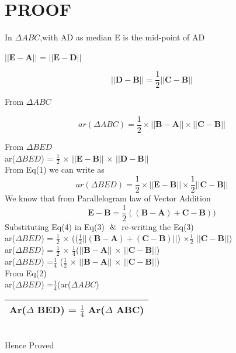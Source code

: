 \documentclass[journal,10pt,twocolumn]{article}
\let\vec\mathbf
\begin{document}
\section{PROOF}
In $\Delta ABC$,with AD as median
E is the mid-point of AD
\begin{center}
    $||{\vec{E-A}}||$ = $||{\vec{E-D}}||$
\end{center}
\begin{center}
\begin{equation}
    ||{\vec{D-B}}|| = \frac{1}{2} ||{\vec{C-B}}||
\end{equation}
\end{center}
\begin{flushleft}
From $\Delta ABC$
\end{flushleft}
\begin{equation}
    ar(\Delta ABC) = \frac{1}{2} \times ||{\vec{B-A}}|| \times ||{\vec{C-B}}||
\end{equation}
\begin{flushleft}
From $\Delta BED$
\vspace{0.3cm}\\
ar($\Delta BED$) = $\frac{1}{2}$ $\times$ $||{\vec{E-B}}||$ $\times$ $||{\vec{D-B}}||$
\vspace{0.3cm}\\
From Eq(1) we can write as
\begin{equation}
    ar(\Delta BED) = \frac{1}{2} \times ||{\vec{E-B}}|| \times\frac{1}{2} ||{\vec{C-B}}||
\end{equation}
We know that from Parallelogram law of Vector Addition
\begin{equation}
     \vec{E-B} = \frac{1}{2} ((\vec{B-A}) + \vec{C-B}))
\end{equation}
Substituting Eq(4) in Eq(3) $\And$ re-writing the Eq(3)\\
\vspace{0.3cm}
ar($\Delta BED$) = $\frac{1}{2}$ $\times$ (($\frac{1}{2}$$||{\vec{(B-A) + (C-B)}}||$) $\times$$\frac{1}{2}$ $||{\vec{C-B}}||$)
\vspace{0.5cm}\\
ar($\Delta BED$) = $\frac{1}{2}$ $\times$ $\frac{1}{4}$($||{\vec{B-A}}||$ $\times$ $||{\vec{C-B}}||$)
\vspace{0.5cm}\\
ar($\Delta BED$) =$\frac{1}{4}$ ($\frac{1}{2}$ $\times$ $||{\vec{B-A}}||$ $\times$ $||{\vec{C-B}}||$)
\vspace{0.5cm}\\
From Eq(2)
\vspace{0.3cm}\\
ar($\Delta BED$) =$\frac{1}{4}$(ar($\Delta ABC$)
\end{flushleft}
\vspace{0.5cm}
\centering
\begin{tabular}{|c|}
\hline
Ar($\Delta$ BED) = $\frac{1}{4}$ Ar($\Delta$ ABC)\\
\hline
\end{tabular}\\
\vspace{0.5cm}
Hence Proved
\end{document}
